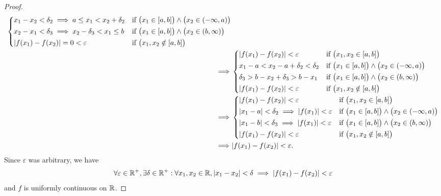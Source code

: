 \begin{proof}
\begin{align*}
\begin{dcases}
                 x_1 - x_2 < \delta_2 \implies a \leq x_1 < x_2 + \delta_2               & \text{if } \big(x_1 \in [a, b]\big) \land \big(x_2 \in (-\infty, a)\big) \\
                 x_2 - x_1 < \delta_3 \implies x_2 - \delta_3 < x_1 \leq b               & \text{if } \big(x_1 \in [a, b]\big) \land \big(x_2 \in (b, \infty)\big)  \\
                 \abs{f(x_1) - f(x_2)} = 0 < \varepsilon                                 & \text{if } \big(x_1, x_2 \notin [a, b]\big)
               \end{dcases} \\
    \implies & \begin{dcases}
                 \abs{f(x_1) - f(x_2)} < \varepsilon     & \text{if } \big(x_1, x_2 \in [a, b]\big)                                 \\
                 x_1 - a < x_2 - a + \delta_2 < \delta_2 & \text{if } \big(x_1 \in [a, b]\big) \land \big(x_2 \in (-\infty, a)\big) \\
                 \delta_3 > b - x_2 + \delta_3 > b - x_1 & \text{if } \big(x_1 \in [a, b]\big) \land \big(x_2 \in (b, \infty)\big)  \\
                 \abs{f(x_1) - f(x_2)} < \varepsilon     & \text{if } \big(x_1, x_2 \notin [a, b]\big)
               \end{dcases}                                 \\
    \implies & \begin{dcases}
                 \abs{f(x_1) - f(x_2)} < \varepsilon                          & \text{if } \big(x_1, x_2 \in [a, b]\big)                                 \\
                 \abs{x_1 - a} < \delta_2 \implies \abs{f(x_1)} < \varepsilon & \text{if } \big(x_1 \in [a, b]\big) \land \big(x_2 \in (-\infty, a)\big) \\
                 \abs{x_1 - b} < \delta_3 \implies \abs{f(x_1)} < \varepsilon & \text{if } \big(x_1 \in [a, b]\big) \land \big(x_2 \in (b, \infty)\big)  \\
                 \abs{f(x_1) - f(x_2)} < \varepsilon                          & \text{if } \big(x_1, x_2 \notin [a, b]\big)
               \end{dcases}            \\
    \implies & \abs{f(x_1) - f(x_2)} < \varepsilon.
  \end{align*}
  Since \(\varepsilon\) was arbitrary, we have
  \[
    \forall \varepsilon \in \mathbb{R}^+, \exists \delta \in \mathbb{R}^+ : \forall x_1, x_2 \in \mathbb{R}, \left\lvert x_1 - x_2\right\rvert < \delta \implies \left\lvert f(x_1) - f(x_2)\right\rvert < \varepsilon
  \]
  and \(f\) is uniformly continuous on \(\mathbb{R}\).
\end{proof}

